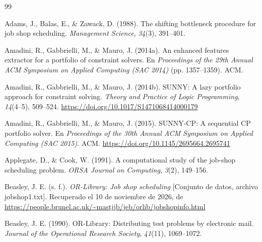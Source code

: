\cleardoublepage
{}
{}

\begin{thebibliography}{99}

Adams, J., Balas, E., \& Zawack, D. (1988). The shifting bottleneck procedure
for job shop scheduling. \textit{Management Science}, \textit{34}(3), 391--401.

Amadini, R., Gabbrielli, M., \& Mauro, J. (2014a). An enhanced features
extractor for a portfolio of constraint solvers. En \textit{Proceedings of the
29th Annual ACM Symposium on Applied Computing (SAC 2014)} (pp. 1357--1359).
ACM.

Amadini, R., Gabbrielli, M., \& Mauro, J. (2014b). SUNNY: A lazy portfolio
approach for constraint solving. \textit{Theory and Practice of Logic
Programming}, \textit{14}(4--5), 509--524.
\url{https://doi.org/10.1017/S1471068414000179}

Amadini, R., Gabbrielli, M., \& Mauro, J. (2015). SUNNY-CP: A sequential CP
portfolio solver. En \textit{Proceedings of the 30th Annual ACM Symposium on
Applied Computing (SAC 2015)}. ACM. \url{https://doi.org/10.1145/2695664.2695741}

Applegate, D., \& Cook, W. (1991). A computational study of the job-shop
scheduling problem. \textit{ORSA Journal on Computing}, \textit{3}(2),
149--156.

Beasley, J. E. (s. f.). \textit{OR-Library: Job shop scheduling} [Conjunto de
datos, archivo jobshop1.txt]. Recuperado el 10 de noviembre de 2026, de
\url{https://people.brunel.ac.uk/~mastjjb/jeb/orlib/jobshopinfo.html}

Beasley, J. E. (1990). OR-Library: Distributing test problems by electronic
mail. \textit{Journal of the Operational Research Society}, \textit{41}(11),
1069--1072.


\end{thebibliography}
